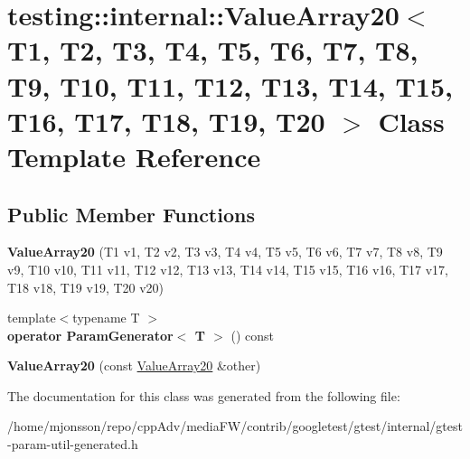 \hypertarget{classtesting_1_1internal_1_1ValueArray20}{}\section{testing\+:\+:internal\+:\+:Value\+Array20$<$ T1, T2, T3, T4, T5, T6, T7, T8, T9, T10, T11, T12, T13, T14, T15, T16, T17, T18, T19, T20 $>$ Class Template Reference}
\label{classtesting_1_1internal_1_1ValueArray20}
\subsection*{Public Member Functions}
\begin{DoxyCompactItemize}
\item 
\mbox{\label{classtesting_1_1internal_1_1ValueArray20_aafa49e909db9556cdb89692976e80c4a}} 
{\bfseries Value\+Array20} (T1 v1, T2 v2, T3 v3, T4 v4, T5 v5, T6 v6, T7 v7, T8 v8, T9 v9, T10 v10, T11 v11, T12 v12, T13 v13, T14 v14, T15 v15, T16 v16, T17 v17, T18 v18, T19 v19, T20 v20)
\item 
\mbox{\label{classtesting_1_1internal_1_1ValueArray20_abcf63e97d31f62868dab49f1667e9d4f}} 
{\footnotesize template$<$typename T $>$ }\\{\bfseries operator Param\+Generator$<$ T $>$} () const
\item 
\mbox{\label{classtesting_1_1internal_1_1ValueArray20_a965099028a2057212ba388b8017f8e68}} 
{\bfseries Value\+Array20} (const \hyperlink{classtesting_1_1internal_1_1ValueArray20}{Value\+Array20} \&other)
\end{DoxyCompactItemize}


The documentation for this class was generated from the following file\+:\begin{DoxyCompactItemize}
\item 
/home/mjonsson/repo/cpp\+Adv/media\+F\+W/contrib/googletest/gtest/internal/gtest-\/param-\/util-\/generated.\+h\end{DoxyCompactItemize}

